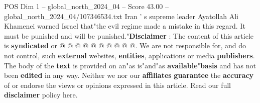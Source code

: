 \begin{textsample}{POS Dim 1 – global\_north\_2024\_04 – Score 43.00 – global\_north\_2024\_04/107346534.txt}
Iran ' s supreme leader Ayatollah Ali Khamenei warned Israel that"the evil regime made a mistake in this regard.
It must be punished and will be punished."\textbf{Disclaimer} : The content of this article is \textbf{syndicated} or @ @ @ @ @ @ @ @ @ @.
We are not responsible for, and do not control, such \textbf{external} websites, \textbf{entities}, applications or media \textbf{publishers}.
The body of the \textbf{text} is provided on an"as is"and"as \textbf{available}"\textbf{basis} and has not been \textbf{edited} in any way.
Neither we nor our \textbf{affiliates} \textbf{guarantee} the \textbf{accuracy} of or endorse the views or opinions expressed in this article.
Read our full \textbf{disclaimer} policy here.

\end{textsample}
